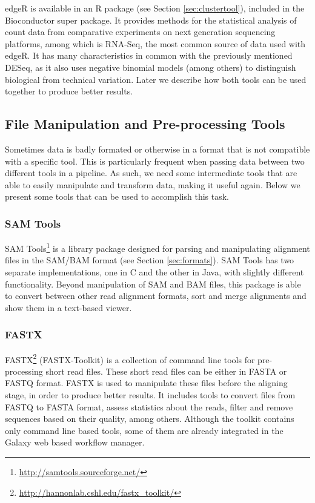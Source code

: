 edgeR \cite{robinson2010edger} is available in an R package (see Section
\ref{sec:clustertool}), included in the Bioconductor super package. It provides
methods for the statistical analysis of count data from comparative experiments
on next generation sequencing platforms, among which is RNA-Seq, the most common
source of data used with edgeR. It has many characteristics in common with the
previously mentioned DESeq, as it also uses negative binomial models (among
others) to distinguish biological from technical variation. Later we describe
how both tools can be used together to produce better results.

\subsection{File Manipulation and Pre-processing Tools}

Sometimes data is badly formated or otherwise in a format that is not compatible
with a specific tool. This is particularly frequent when passing data between
two different tools in a pipeline. As such, we need some intermediate tools that
are able to easily manipulate and transform data, making it useful again. Below
we present some tools that can be used to accomplish this task.

\subsubsection*{SAM Tools}

SAM Tools\footnote{\url{http://samtools.sourceforge.net/}} is a library
package designed for parsing and manipulating alignment files in the SAM/BAM
format \cite{Li2009} (see Section \ref{sec:formats}). SAM Tools has two separate
implementations, one in C and the other in Java, with slightly different
functionality. Beyond manipulation of SAM and BAM files, this package is able to
convert between other read alignment formats, sort and merge alignments and show
them in a text-based viewer.

\subsubsection*{FASTX}

FASTX\footnote{\url{http://hannonlab.cshl.edu/fastx_toolkit/}} (FASTX-Toolkit)
is a collection of command line tools for pre-processing short read files. These
short read files can be either in FASTA or FASTQ format. FASTX is used to
manipulate these files before the aligning stage, in order to produce better
results. It includes tools to convert files from FASTQ to FASTA format, assess
statistics about the reads, filter and remove sequences based on their quality,
among others. Although the toolkit contains only command line based tools, some
of them are already integrated in the Galaxy web based workflow manager.

